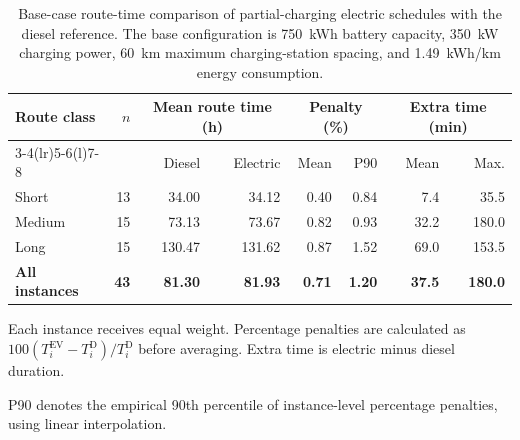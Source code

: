\begin{table}[tbp]
\centering
\begin{threeparttable}
\caption{Base-case route-time comparison of partial-charging electric schedules with the diesel reference. The base configuration is 750~kWh battery capacity, 350~kW charging power, 60~km maximum charging-station spacing, and 1.49~kWh/km energy consumption.}
\label{tab:conditions_base}
\small
\setlength{\tabcolsep}{4pt}
\begin{tabular}{@{}lrrrrrrr@{}}
\toprule
Route class & $n$ & \multicolumn{2}{c}{Mean route time (h)} & \multicolumn{2}{c}{Penalty (\%)} & \multicolumn{2}{c}{Extra time (min)} \\
\cmidrule(lr){3-4}\cmidrule(lr){5-6}\cmidrule(l){7-8}
 & & Diesel & Electric & Mean & P90 & Mean & Max. \\
\midrule
Short & 13 & 34.00 & 34.12 & 0.40 & 0.84 & 7.4 & 35.5 \\
Medium & 15 & 73.13 & 73.67 & 0.82 & 0.93 & 32.2 & 180.0 \\
Long & 15 & 130.47 & 131.62 & 0.87 & 1.52 & 69.0 & 153.5 \\
\midrule
\textbf{All instances} & \textbf{43} & \textbf{81.30} & \textbf{81.93} & \textbf{0.71} & \textbf{1.20} & \textbf{37.5} & \textbf{180.0} \\
\bottomrule
\end{tabular}
\begin{tablenotes}[flushleft]\footnotesize
\item Each instance receives equal weight. Percentage penalties are calculated as $100(T_i^{\mathrm{EV}}-T_i^{\mathrm{D}})/T_i^{\mathrm{D}}$ before averaging. Extra time is electric minus diesel duration.
\item P90 denotes the empirical 90th percentile of instance-level percentage penalties, using linear interpolation.
\end{tablenotes}
\end{threeparttable}
\end{table}
